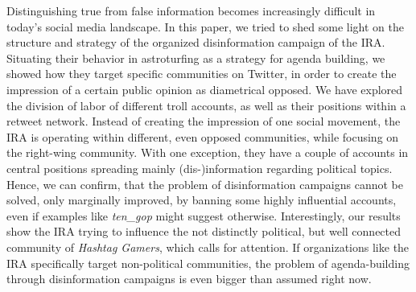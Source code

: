 \documentclass[12pt, titlepage=true, toc=bib]{scrartcl}
\begin{document}
Distinguishing true from false information becomes increasingly difficult in today's social media landscape. In this paper, we tried to shed some light on the structure and strategy of the organized disinformation campaign of the IRA. Situating their behavior in astroturfing as a strategy for agenda building, we showed how they target specific communities on Twitter, in order to create the impression of a certain public opinion as diametrical opposed. We have explored the division of labor of different troll accounts, as well as their positions within a retweet network. Instead of creating the impression of one social movement, the IRA is operating within different, even opposed communities, while focusing on the right-wing community. With one exception, they have a couple of accounts in central positions spreading mainly (dis-)information regarding political topics. Hence, we can confirm, that the problem of disinformation campaigns cannot be solved, only marginally improved, by banning some highly influential accounts, even if examples like \textit{ten\_gop} might suggest otherwise. Interestingly, our results show the IRA trying to influence the not distinctly political, but well connected community of \textit{Hashtag Gamers}, which calls for attention. If organizations like the IRA specifically target non-political communities, the problem of agenda-building through disinformation campaigns is even bigger than assumed right now.
\end{document}
